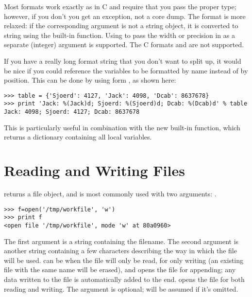 \documentclass{manual}
\begin{document}
Most formats work exactly as in C and require that you pass the proper
type; however, if you don't you get an exception, not a core dump.
The  format is more relaxed: if the corresponding argument is
not a string object, it is converted to string using the
 built-in function.  Using \code{*} to pass the width
or precision in as a separate (integer) argument is supported.  The
C formats  and  are not supported.

If you have a really long format string that you don't want to split
up, it would be nice if you could reference the variables to be
formatted by name instead of by position.  This can be done by using
form , as shown here:

\begin{verbatim}
>>> table = {'Sjoerd': 4127, 'Jack': 4098, 'Dcab': 8637678}
>>> print 'Jack: %(Jack)d; Sjoerd: %(Sjoerd)d; Dcab: %(Dcab)d' % table
Jack: 4098; Sjoerd: 4127; Dcab: 8637678
\end{verbatim}

This is particularly useful in combination with the new built-in
 function, which returns a dictionary containing all
local variables.

\section{Reading and Writing Files \label{files}}

 returns a file
object, and is most commonly used with two arguments:
.

\begin{verbatim}
>>> f=open('/tmp/workfile', 'w')
>>> print f
<open file '/tmp/workfile', mode 'w' at 80a0960>
\end{verbatim}

The first argument is a string containing the filename.  The second
argument is another string containing a few characters describing the
way in which the file will be used.   can be  when
the file will only be read,  for only writing (an existing
file with the same name will be erased), and  opens the file
for appending; any data written to the file is automatically added to
the end.   opens the file for both reading and writing.
The  argument is optional;  will be assumed if
it's omitted.
\end{document}
